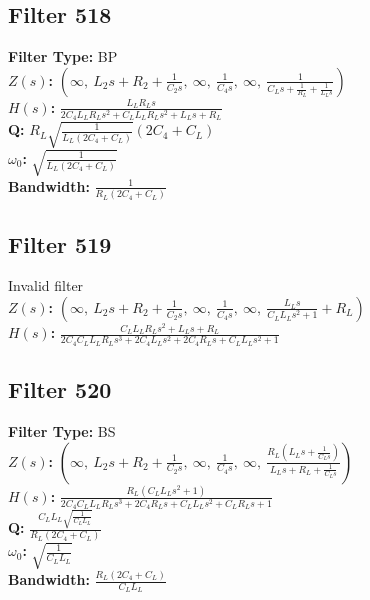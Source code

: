 \documentclass{article}
\begin{document}
\subsection*{Filter 518}
\textbf{Filter Type:} BP \\ 
\textbf{$Z(s)$:} $\left( \infty, \  L_{2} s + R_{2} + \frac{1}{C_{2} s}, \  \infty, \  \frac{1}{C_{4} s}, \  \infty, \  \frac{1}{C_{L} s + \frac{1}{R_{L}} + \frac{1}{L_{L} s}}\right)$ \\ 
\textbf{$H(s)$:} $\frac{L_{L} R_{L} s}{2 C_{4} L_{L} R_{L} s^{2} + C_{L} L_{L} R_{L} s^{2} + L_{L} s + R_{L}}$ \\ 
\textbf{Q:} $R_{L} \sqrt{\frac{1}{L_{L} \left(2 C_{4} + C_{L}\right)}} \left(2 C_{4} + C_{L}\right)$ \\ 
\textbf{$\omega_0$:} $\sqrt{\frac{1}{L_{L} \left(2 C_{4} + C_{L}\right)}}$ \\ 
\textbf{Bandwidth:} $\frac{1}{R_{L} \left(2 C_{4} + C_{L}\right)}$ \\ 
\subsection*{Filter 519}
Invalid filter \\ 
\textbf{$Z(s)$:} $\left( \infty, \  L_{2} s + R_{2} + \frac{1}{C_{2} s}, \  \infty, \  \frac{1}{C_{4} s}, \  \infty, \  \frac{L_{L} s}{C_{L} L_{L} s^{2} + 1} + R_{L}\right)$ \\ 
\textbf{$H(s)$:} $\frac{C_{L} L_{L} R_{L} s^{2} + L_{L} s + R_{L}}{2 C_{4} C_{L} L_{L} R_{L} s^{3} + 2 C_{4} L_{L} s^{2} + 2 C_{4} R_{L} s + C_{L} L_{L} s^{2} + 1}$ \\ 
\subsection*{Filter 520}
\textbf{Filter Type:} BS \\ 
\textbf{$Z(s)$:} $\left( \infty, \  L_{2} s + R_{2} + \frac{1}{C_{2} s}, \  \infty, \  \frac{1}{C_{4} s}, \  \infty, \  \frac{R_{L} \left(L_{L} s + \frac{1}{C_{L} s}\right)}{L_{L} s + R_{L} + \frac{1}{C_{L} s}}\right)$ \\ 
\textbf{$H(s)$:} $\frac{R_{L} \left(C_{L} L_{L} s^{2} + 1\right)}{2 C_{4} C_{L} L_{L} R_{L} s^{3} + 2 C_{4} R_{L} s + C_{L} L_{L} s^{2} + C_{L} R_{L} s + 1}$ \\ 
\textbf{Q:} $\frac{C_{L} L_{L} \sqrt{\frac{1}{C_{L} L_{L}}}}{R_{L} \left(2 C_{4} + C_{L}\right)}$ \\ 
\textbf{$\omega_0$:} $\sqrt{\frac{1}{C_{L} L_{L}}}$ \\ 
\textbf{Bandwidth:} $\frac{R_{L} \left(2 C_{4} + C_{L}\right)}{C_{L} L_{L}}$ \\ 
\end{document}
